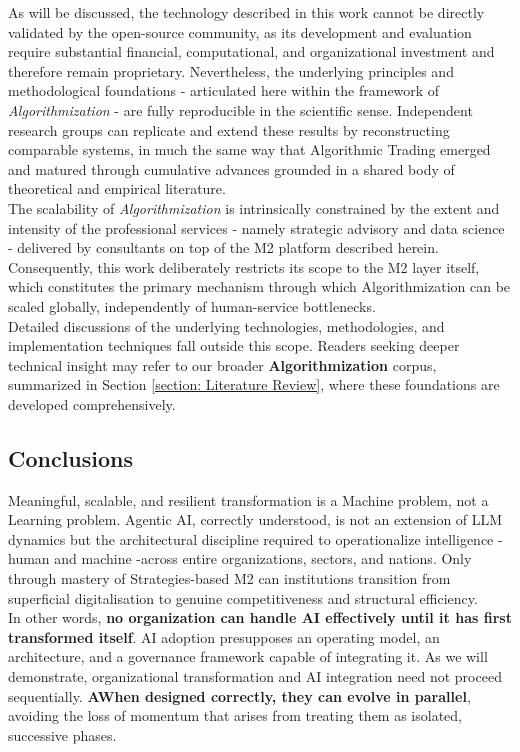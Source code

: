 \documentclass{article}
\begin{document}
As will be discussed, the technology described in this work cannot be directly validated by the open-source community, as its development and evaluation require substantial financial, computational, and organizational investment and therefore remain proprietary. Nevertheless, the underlying principles and methodological foundations - articulated here within the framework of \textit{Algorithmization} - are fully reproducible in the scientific sense. Independent research groups can replicate and extend these results by reconstructing comparable systems, in much the same way that Algorithmic Trading emerged and matured through cumulative advances grounded in a shared body of theoretical and empirical literature.\\

The scalability of \textit{Algorithmization} is intrinsically constrained by the extent and intensity of the professional services - namely strategic advisory and data science - delivered by consultants on top of the M2 platform described herein. Consequently, this work deliberately restricts its scope to the M2 layer itself, which constitutes the primary mechanism through which Algorithmization can be scaled globally, independently of human-service bottlenecks.\\

Detailed discussions of the underlying technologies, methodologies, and implementation techniques fall outside this scope. Readers seeking deeper technical insight may refer to our broader \textbf{Algorithmization} corpus, summarized in Section \ref{section: Literature Review}, where these foundations are developed comprehensively.\\


\subsection{Conclusions}
\label{subsection: Conclusions 1}

Meaningful, scalable, and resilient transformation is a Machine problem, not a Learning problem. Agentic AI, correctly understood, is not an extension of LLM dynamics but the architectural discipline required to operationalize intelligence - human and machine -across entire organizations, sectors, and nations. Only through mastery of Strategies-based M2 can institutions transition from superficial digitalisation to genuine competitiveness and structural efficiency.\\

In other words, \textbf{no organization can handle AI effectively until it has first transformed itself}. AI adoption presupposes an operating model, an architecture, and a governance framework capable of integrating it. As we will demonstrate, organizational transformation and AI integration need not proceed sequentially. \textbf{AWhen designed correctly, they can evolve in parallel}, avoiding the loss of momentum that arises from treating them as isolated, successive phases.\\
\end{document}
